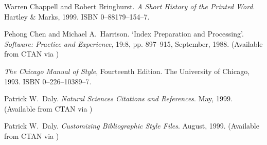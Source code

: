 \begin{thebibliography}{GMS94A}
  Warren Chappell and Robert Bringhurst.
  \newblock \emph{A Short History of the Printed Word}.
  \newblock Hartley \& Marks, 1999.
  \newblock ISBN 0--88179--154--7.

  Pehong Chen and Michael A.~Harrison.
  \newblock `Index Preparation and Processing'.
  \newblock \emph{Software: Practice and Experience}, 19:8, pp. 897--915,
            September, 1988.
  \newblock (Available from CTAN via
             )

\begin{comment}
\bibitem[Che05]{CHENG05}
  Karen Cheng.
  \newblock \emph{Designing Type}.
  \newblock Yale University Press, 2005.
  \newblock ISBN 0--300--11150--9.
\end{comment}

  \newblock \emph{The Chicago Manual of Style}, Fourteenth Edition.
  \newblock The University of Chicago, 1993.
  \newblock ISBN 0--226--10389--7.


\begin{comment}
\bibitem[Coc02]{SUBFIGURE}
  Steven Douglas Cochran.
  \newblock \emph{The subfigure package}.
  \newblock March, 2002.
  \newblock (Available from CTAN in
             \url{/macros/latex/contrib/subfigure})

\bibitem[CG96]{CONWAY96}
  John H.~Conway and Richard K.~Guy.
  \newblock \emph{The Book of Numbers}.
  \newblock Copernicus, Springer-Verlag, 1996.
  \newblock ISBN 0--387--97993--X.

\bibitem[Cra92]{CRAIG92}
  James Craig.
  \newblock \emph{Designing with Type: A Basic Course in Typography}.
  \newblock Watson-Guptill, NY,
  \newblock 1992.
\end{comment}

  Patrick W.~Daly.
  \newblock \emph{Natural Sciences Citations and References}.
  \newblock May, 1999.
  \newblock (Available from CTAN via
             )

  Patrick W.~Daly.
  \newblock \emph{Customizing Bibliographic Style Files}.
  \newblock August, 1999.
  \newblock (Available from CTAN via
             )

\begin{comment}
\bibitem[Deg92]{DEGANI92}
  Asaf Degani.
  \newblock \emph{On the Typography of Flight-Deck Documentation}.
  \newblock NASA Contractor Report \# 177605.
  \newblock December, 1992.
  \newblock (Available from 
             \url{http://members.aol.com/willadams/typgrphy.htm#NASA})
\end{comment}


\end{thebibliography}
